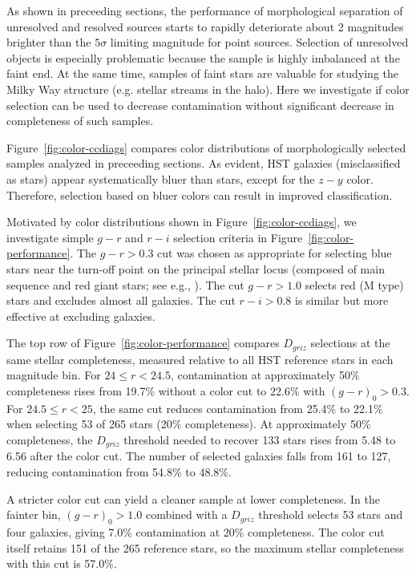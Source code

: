 As shown in preceeding sections, the performance of morphological separation of unresolved and
resolved sources starts to rapidly deteriorate about 2 magnitudes brighter than the $5\sigma$
limiting magnitude for point sources. Selection of unresolved objects is especially problematic
because the sample is highly imbalanced at the faint end. At the same time, samples of faint stars
are valuable for studying the Milky Way structure (e.g. stellar streams in the halo). Here we 
investigate if color selection can be used to decrease contamination without significant decrease
in completeness of such samples. 
 
Figure~\ref{fig:color-ccdiags} compares color distributions of morphologically selected samples
analyzed in preceeding sections. As evident, HST galaxies (misclassified as stars) appear
systematically bluer than stars, except for the $z-y$ color. Therefore, selection based on bluer
colors can result in improved classification.

Motivated by color distributions shown in
Figure~\ref{fig:color-ccdiags}, we investigate simple $g-r$ and $r-i$ selection criteria in
Figure~\ref{fig:color-performance}. The $g-r>0.3$ cut was chosen as appropriate for
selecting blue stars near the turn-off point on the principal stellar locus (composed of main
sequence and red giant stars; see e.g., \citealt{2026A&A...707A.333P}). The cut $g-r>1.0$ 
selects red (M type) stars and excludes almost all galaxies. The cut $r-i > 0.8$ is similar
but more effective at excluding galaxies.

The top row of Figure~\ref{fig:color-performance} compares $D_{griz}$
selections at the same stellar completeness, measured relative to all HST
reference stars in each magnitude bin. For $24\leq r<24.5$, contamination
at approximately 50\% completeness rises from 19.7\% without a color cut
to 22.6\% with $(g-r)_0>0.3$. For $24.5\leq r<25$, the same cut reduces
contamination from 25.4\% to 22.1\% when selecting 53 of 265 stars (20\%
completeness). At approximately 50\% completeness, the $D_{griz}$ threshold
needed to recover 133 stars rises from 5.48 to 6.56 after the color cut.
The number of selected galaxies falls from 161 to 127, reducing
contamination from 54.8\% to 48.8\%.

A stricter color cut can yield a cleaner sample at lower completeness.
In the fainter bin, $(g-r)_0>1.0$ combined with a $D_{griz}$ threshold
selects 53 stars and four galaxies, giving 7.0\% contamination at 20\%
completeness. The color cut itself retains 151 of the 265 reference stars,
so the maximum stellar completeness with this cut is 57.0\%.



